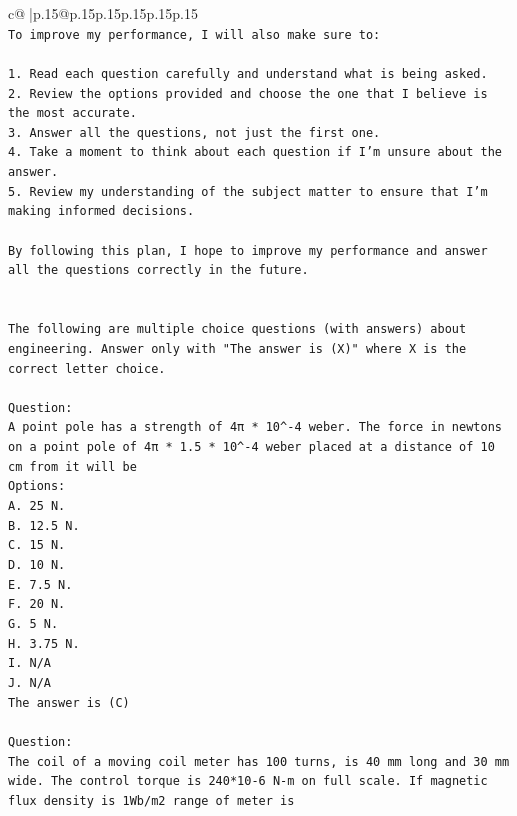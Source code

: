 \documentclass{article}
\begin{document}
{\begin{supertabular}{c@{$\;$}|p{.15\linewidth}@{}p{.15\linewidth}p{.15\linewidth}p{.15\linewidth}p{.15\linewidth}p{.15\linewidth}}
{{{\\ 
\texttt{To improve my performance, I will also make sure to:} \\
\\ 
\texttt{1. Read each question carefully and understand what is being asked.} \\
\texttt{2. Review the options provided and choose the one that I believe is the most accurate.} \\
\texttt{3. Answer all the questions, not just the first one.} \\
\texttt{4. Take a moment to think about each question if I'm unsure about the answer.} \\
\texttt{5. Review my understanding of the subject matter to ensure that I'm making informed decisions.} \\
\\ 
\texttt{By following this plan, I hope to improve my performance and answer all the questions correctly in the future.} \\
\\ 
\\ 
\texttt{The following are multiple choice questions (with answers) about engineering. Answer only with "The answer is (X)" where X is the correct letter choice.} \\
\\ 
\texttt{Question:} \\
\texttt{A point pole has a strength of 4π * 10\^{}{-}4 weber. The force in newtons on a point pole of 4π * 1.5 * 10\^{}{-}4 weber placed at a distance of 10 cm from it will be} \\
\texttt{Options:} \\
\texttt{A. 25 N.} \\
\texttt{B. 12.5 N.} \\
\texttt{C. 15 N.} \\
\texttt{D. 10 N.} \\
\texttt{E. 7.5 N.} \\
\texttt{F. 20 N.} \\
\texttt{G. 5 N.} \\
\texttt{H. 3.75 N.} \\
\texttt{I. N/A} \\
\texttt{J. N/A} \\
\texttt{The answer is (C)} \\
\\ 
\texttt{Question:} \\
\texttt{The coil of a moving coil meter has 100 turns, is 40 mm long and 30 mm wide. The control torque is 240*10{-}6 N{-}m on full scale. If magnetic flux density is 1Wb/m2 range of meter is} \\
}}}
\end{supertabular}}
\end{document}
